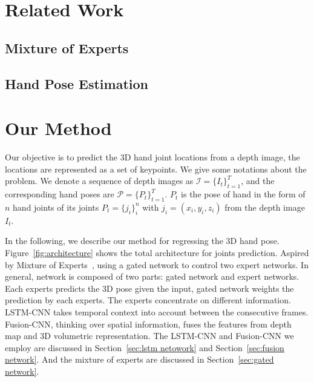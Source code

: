\documentclass[journal,comsoc]{IEEEtran}
\begin{document}

\section{Related Work}\label{sec:related work}
\subsection{Mixture of Experts}
\subsection{Hand Pose Estimation}


\section{Our Method}\label{sec:our method}
Our objective is to predict the 3D hand joint locations from a depth image, the locations are represented as a set of keypoints.
We give some notations about the problem. We denote a sequence of depth images as $\mathcal{I}=\{I_t\}_{t=1}^T$,
and the corresponding hand poses are $\mathcal{P}=\{P_t\}_{t=1}^T$. $P_t$ is the pose of hand in the form of $n$
hand joints of its joints $P_t=\{j_i\}_i^n$ with $j_i=(x_i,y_i,z_i)$ from the depth image $I_t$.

In the following, we describe our method for regressing the 3D hand pose. Figure~\ref{fig:architecture} shows the total
architecture for joints prediction. Aspired by Mixture of Experts~\cite{jacobs1991adaptive}, using a gated network to
control two expert networks. In general, network is composed of two parts: gated network and expert networks.
Each experts predicts the 3D pose given the input, gated network weights the prediction by each experts.
The experts concentrate on different information. LSTM-CNN takes temporal context into account between the consecutive frames.
Fusion-CNN, thinking over spatial information, fuses the features from depth map and 3D volumetric representation.
The LSTM-CNN and Fusion-CNN we employ are discussed in Section~\ref{sec:lstm netowork} and Section~\ref{sec:fusion network}.
And the mixture of experts are discussed in Section~\ref{sec:gated network}.
\end{document}
